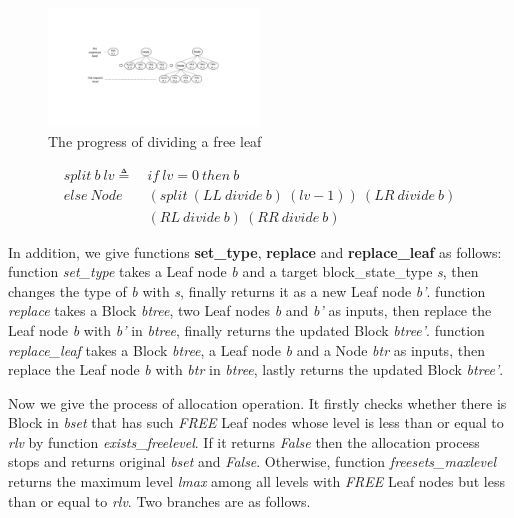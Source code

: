 \begin{figure}[htbp]
	\centering
	\includegraphics[width=0.5\textwidth]{fig1.pdf}
	\caption{The progress of dividing a free leaf}
	\label{fig1}
\end{figure}

\begin{definition} 
\end{definition}
\vspace{-7pt}
{\footnotesize
\begin{align*}
split\ b\ lv \triangleq\ &if\ lv = 0\ then\ b \\
else\ Node\ &(split\ (LL\ divide\ b)\ (lv - 1))\ (LR\ divide\ b)\\ 
&(RL\ divide\ b)\ (RR\ divide\ b)
\end{align*}
}	
\vspace{-12pt}

In addition, we give functions \textbf{set\_type}, \textbf{replace} and \textbf{replace\_leaf} as follows: function \emph{set\_type} takes a Leaf node \emph{b} and a target block\_state\_type \emph{s}, then changes the type of \emph{b} with \emph{s}, finally returns it as a new Leaf node \emph{b'}. function \emph{replace} takes a Block \emph{btree}, two Leaf nodes \emph{b} and \emph{b'} as inputs, then replace the Leaf node \emph{b} with \emph{b'} in \emph{btree}, finally returns the updated Block \emph{btree'}. function \emph{replace\_leaf} takes a Block \emph{btree}, a Leaf node \emph{b} and a Node \emph{btr} as inputs, then replace the Leaf node \emph{b} with \emph{btr} in \emph{btree}, lastly returns the updated Block \emph{btree'}. 

Now we give the process of allocation operation. It firstly checks whether there is Block in \emph{bset} that has such \emph{FREE} Leaf nodes whose level is less than or equal to \emph{rlv} by function \emph{exists\_freelevel}. If it returns \emph{False} then the allocation process stops and returns original \emph{bset} and \emph{False}. Otherwise, function \emph{freesets\_maxlevel} returns the maximum level \emph{lmax} among all levels with \emph{FREE} Leaf nodes but less than or equal to \emph{rlv}. Two branches are as follows.

